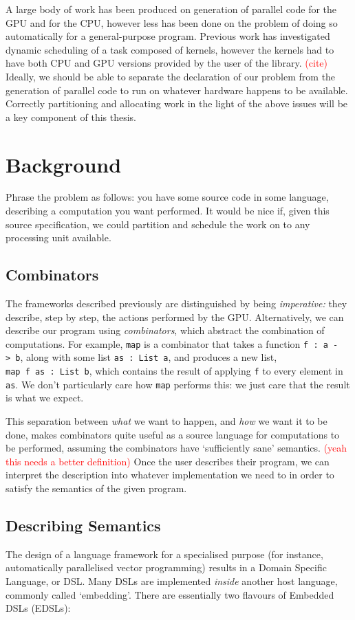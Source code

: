 \documentclass[a4paper,12pt]{article}
\newcommand{\red}[1]{\textcolor{red}{#1}}
\newcommand{\icf}[1]{\mbox{\texttt{#1}}} %
\begin{document}
A large body of work has been produced on generation of parallel code for the GPU and for the CPU, \citep{lee_transparent_2013} however less has been done on the problem of doing so automatically for a general-purpose program. 
Previous work has investigated dynamic scheduling of a task composed of kernels, however the kernels had to have both CPU and GPU versions provided by the user of the library. 
\red{(cite)} 
Ideally, we should be able to separate the declaration of our problem from the generation of parallel code to run on whatever hardware happens to be available.
Correctly partitioning and allocating work in the light of the above issues will be a key component of this thesis.

\section{Background}
Phrase the problem as follows: you have some source code in some language, describing a computation you want performed. 
It would be nice if, given this source specification, we could partition and schedule the work on to any processing unit available. 

\subsection{Combinators}
The frameworks described previously are distinguished by being \textit{imperative:} they describe, step by step, the actions performed by the GPU.
Alternatively, we can describe our program using \textit{combinators}, which abstract the combination of computations. 
For example, \icf{map} is a combinator that takes a function \icf{f\ :\  a\ ->\ b}, along with some list \icf{as\ :\ List\ a}, and produces a new list, \icf{map\ f\ as\ :\ List\ b}, which contains the result of applying \icf{f} to every element in \icf{as}. 
We don't particularly care how \icf{map} performs this: we just care that the result is what we expect.

This separation between \textit{what} we want to happen, and \textit{how} we want it to be done, makes combinators quite useful as a source language for computations to be performed, assuming the combinators have `sufficiently sane' semantics. 
\red{(yeah this needs a better definition)} 
Once the user describes their program, we can interpret the description into whatever implementation we need to in order to satisfy the semantics of the given program.

\subsection{Describing Semantics}
The design of a language framework for a specialised purpose (for instance, automatically parallelised vector programming) results in a Domain Specific Language, or DSL. 
Many DSLs are implemented \textit{inside} another host language, commonly called `embedding'. There are essentially two flavours of Embedded DSLs (EDSLs):
\end{document}
